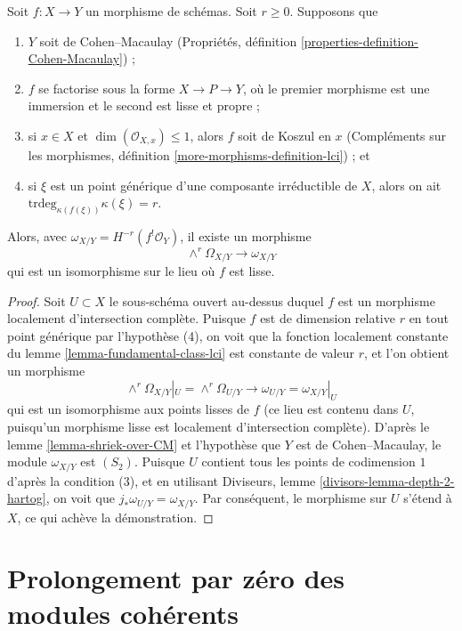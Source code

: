 \begin{lemma}
\label{lemma-fundamental-class-almost-lci}
Soit $f : X \to Y$ un morphisme de schémas. Soit $r \geq 0$. Supposons que
\begin{enumerate}
\item $Y$ soit de Cohen–Macaulay (Propriétés, définition \ref{properties-definition-Cohen-Macaulay}) ;
\item $f$ se factorise sous la forme $X \to P \to Y$, où le premier morphisme est une immersion et le second est lisse et propre ;
\item si $x \in X$ et $\dim(\mathcal{O}_{X, x}) \leq 1$, alors $f$ soit de Koszul en $x$ (Compléments sur les morphismes, définition \ref{more-morphisms-definition-lci}) ; et
\item si $\xi$ est un point générique d'une composante irréductible de $X$, alors on ait
$\text{trdeg}_{\kappa(f(\xi))} \kappa(\xi) = r$.
\end{enumerate}
Alors, avec $\omega_{X/Y} = H^{-r}(f^!\mathcal{O}_Y)$, il existe un morphisme
$$
\wedge^r\Omega_{X/Y} \longrightarrow \omega_{X/Y}
$$
qui est un isomorphisme sur le lieu où $f$ est lisse.
\end{lemma}

\begin{proof}
Soit $U \subset X$ le sous-schéma ouvert au-dessus duquel $f$ est un morphisme localement d'intersection complète. Puisque $f$ est de dimension relative $r$ en tout point générique par l'hypothèse (4), on voit que la fonction localement constante du lemme \ref{lemma-fundamental-class-lci} est constante de valeur $r$, et l'on obtient un morphisme
$$
\wedge^r\Omega_{X/Y}|_U = \wedge^r \Omega_{U/Y}
\longrightarrow
\omega_{U/Y} = \omega_{X/Y}|_U
$$
qui est un isomorphisme aux points lisses de $f$ (ce lieu est contenu dans $U$, puisqu'un morphisme lisse est localement d'intersection complète). D'après le lemme \ref{lemma-shriek-over-CM} et l'hypothèse que $Y$ est de Cohen–Macaulay, le module $\omega_{X/Y}$ est $(S_2)$. Puisque $U$ contient tous les points de codimension $1$ d'après la condition (3), et en utilisant Diviseurs, lemme \ref{divisors-lemma-depth-2-hartog}, on voit que $j_*\omega_{U/Y} = \omega_{X/Y}$. Par conséquent, le morphisme sur $U$ s'étend à $X$, ce qui achève la démonstration.
\end{proof}






\section{Prolongement par zéro des modules cohérents}
\label{section-extension-by-zero}

